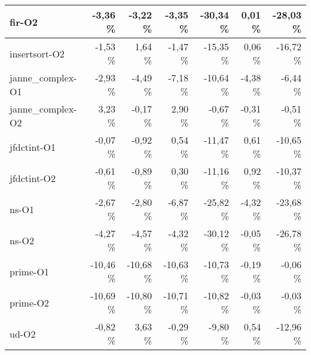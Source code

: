 {\begin{tabular}{|l|r|r|r|r|r|r|}
fir-O2 & -3,36 \% & -3,22 \% & -3,35 \% & -30,34 \% & 0,01 \% & -28,03 \%
\tabularnewline\hline

insertsort-O2 & -1,53 \% & 1,64 \% & -1,47 \% & -15,35 \% & 0,06 \% & -16,72 \%
\tabularnewline\hline

janne\_complex-O1 & -2,93 \% & -4,49 \% & -7,18 \% & -10,64 \% & -4,38 \% & -6,44 \%
\tabularnewline\hline

janne\_complex-O2 & 3,23 \% & -0,17 \% & 2,90 \% & -0,67 \% & -0,31 \% & -0,51 \%
\tabularnewline\hline

jfdctint-O1 & -0,07 \% & -0,92 \% & 0,54 \% & -11,47 \% & 0,61 \% & -10,65 \%
\tabularnewline\hline

jfdctint-O2 & -0,61 \% & -0,89 \% & 0,30 \% & -11,16 \% & 0,92 \% & -10,37 \%
\tabularnewline\hline

ns-O1 & -2,67 \% & -2,80 \% & -6,87 \% & -25,82 \% & -4,32 \% & -23,68 \%
\tabularnewline\hline

ns-O2 & -4,27 \% & -4,57 \% & -4,32 \% & -30,12 \% & -0,05 \% & -26,78 \%
\tabularnewline\hline

prime-O1 & -10,46 \% & -10,68 \% & -10,63 \% & -10,73 \% & -0,19 \% & -0,06 \%
\tabularnewline\hline

prime-O2 & -10,69 \% & -10,80 \% & -10,71 \% & -10,82 \% & -0,03 \% & -0,03 \%
\tabularnewline\hline

ud-O2 & -0,82 \% & 3,63 \% & -0,29 \% & -9,80 \% & 0,54 \% & -12,96 \%
\tabularnewline\hline

\end{tabular}
}
